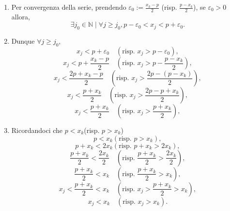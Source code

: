 \begin{demonstration}
\begin{enumerate}[label=(\roman*)]
\begin{enumerate}[label=\arabic*.]
\begin{enumerate}[label=\arabic{enumii}.\arabic*.]
\[                    \frac{x_k - p}{2} > 0 \quad\left(\text{risp. $\frac{p - x_k}{2} > 0$}\right),\]\[
                    \frac{x_k - p}{2} > 0 \quad\left(\text{risp. $\frac{p - x_k}{2} > 0$}\right).\]\[
                \]
                \item Per convergenza della serie, prendendo $\varepsilon_0 := \frac{x_k - p}{2}$ (risp. $\frac{p - x_k}{2}$), se $\varepsilon_0 >0$ allora, \[
                    \exists j_0\in\mathbb{N} \mid \forall j\geq j_0, p-\varepsilon_0 <x_j< p+\varepsilon_0.\]
                \item Dunque $\forall j \geq j_0$, \[
                    x_j< p+\varepsilon_0 \quad\left(\text{risp. $x_j > p-\varepsilon_0$}\right), \]\[
                    x_j< p+\frac{x_k - p}{2} \quad\left(\text{risp. $x_j > p-\frac{p - x_k}{2}$}\right), \]\[
                    x_j< \frac{2p + x_k - p}{2} \quad\left(\text{risp. $x_j > \frac{2p - \left(p - x_k\right)}{2}$}\right), \]\[
                    x_j< \frac{p + x_k}{2} \quad\left(\text{risp. $x_j > \frac{2p - p + x_k}{2}$}\right), \]\[
                    x_j< \frac{p + x_k}{2} \quad\left(\text{risp. $x_j > \frac{p + x_k}{2}$}\right), \]\[
                \]

                \item Ricordandoci che $p < x_k$(risp. $p > x_k$) \[
                    p < x_k \left(\text{risp. $p > x_k$}\right), \]\[
                    p + x_k< 2x_k \left(\text{risp. $p + x_k> 2x_k$}\right), \]\[
                    \frac{p + x_k}{2} < \frac{2x_k}{2} \quad\left(\text{risp. $\frac{p + x_k}{2} >  \frac{2x_k}{2}$}\right), \]\[
                    \frac{p + x_k}{2} < x_k \quad\left(\text{risp. $\frac{p + x_k}{2} >  x_k$}\right), \]\[
                    x_j < \frac{p + x_k}{2} < x_k \quad\left(\text{risp. $x_j > \frac{p + x_k}{2} >  x_k$}\right), \]\[
                    x_j < x_k \quad\left(\text{risp. $x_j >  x_k$}\right). \]\[
                \]


\end{enumerate}
\end{enumerate}
\end{enumerate}
\end{demonstration}
